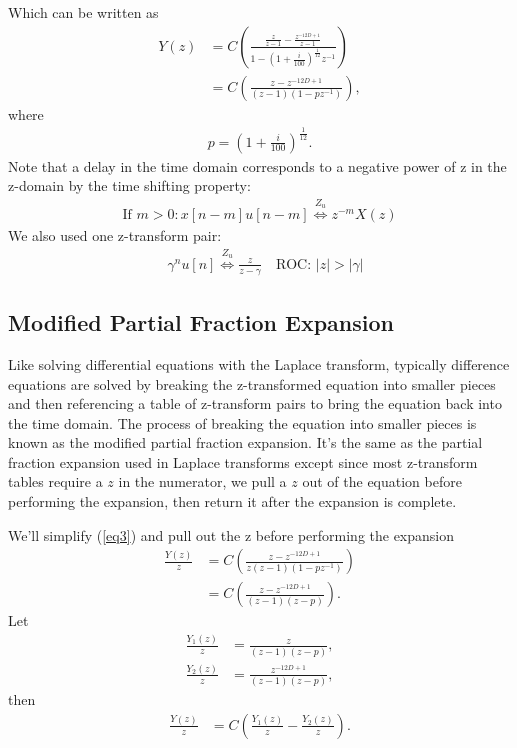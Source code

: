 \documentclass[letterpaper]{article}
\begin{document}
Which can be written as
\begin{align}
	Y(z) &=  C\left(\frac{\frac{z}{z-1} - \frac{z^{-12D+1}}{z-1}}
	{1 - \left(1 + \frac{i}{100} \right)^{\frac{1}{12}}z^{-1}}\right) \\
	     &=  C\left(\frac{z - z^{-12D+1}}{(z-1)(1 - p z^{-1})}\right), \label{eq3}
\end{align}
where 
\begin{align}
	p = \left(1 + \frac{i}{100} \right)^{\frac{1}{12}}.
\end{align}
Note that a delay in the time domain corresponds to a negative power of z in the z-domain by the time shifting property:
\begin{align}
	\text{If }m>0: x[n-m]u[n-m] \stackrel{Z_u}{\Longleftrightarrow} z^{-m} X(z) \label{prop1}
\end{align}
We also used one z-transform pair:
\begin{align}
	&\gamma^nu[n] \stackrel{Z_u}{\Longleftrightarrow} \frac{z}{z-\gamma} \quad\text{ROC: } |z|>|\gamma| \label{tp1}
\end{align}

\subsection{Modified Partial Fraction Expansion}
Like solving differential equations with the Laplace transform, typically difference equations are solved by breaking the z-transformed equation into smaller pieces and then referencing a table of z-transform pairs to bring the equation back into the time domain. The process of breaking the equation into smaller pieces is known as the modified partial fraction expansion. It's the same as the partial fraction expansion used in Laplace transforms except since most z-transform tables require a $z$ in the numerator, we pull a $z$ out of the equation before performing the expansion, then return it after the expansion is complete.

We'll simplify (\ref{eq3}) and pull out the z before performing the expansion
\begin{align}
	\frac{Y(z)}{z} &= C \left( \frac{z - z^{-12D+1}}{z(z-1)(1 - pz^{-1})} \right) \\
	&= C \left( \frac{z - z^{-12D+1}}{(z-1)(z - p)} \right).
\end{align}
Let
\begin{align}
	\frac{Y_1(z)}{z} &= \frac{z}{(z-1)(z - p)}, \\
	\frac{Y_2(z)}{z} &= \frac{z^{-12D+1}}{(z-1)(z - p)},
\end{align}
then
\begin{align}
	\frac{Y(z)}{z} &= C \left( \frac{Y_1(z)}{z} - \frac{Y_2(z)}{z} \right).
\end{align}
\end{document}
